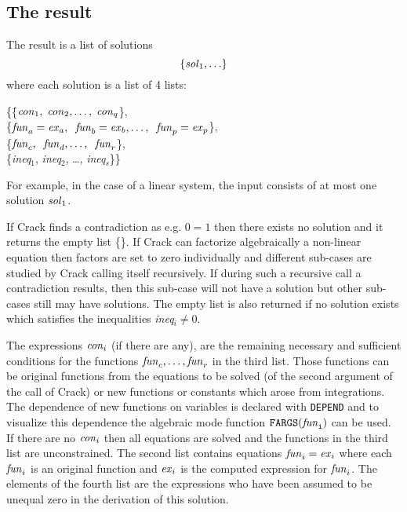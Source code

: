 \documentclass[12pt]{article}
\begin{document}
\subsection{The result}
The result is a list of solutions
\[      \{{\it sol}_1, \ldots \}  \]
where each solution is a list of 4 lists:
\begin{tabbing}
    \{\=\{${\it con}_1, \; {\it con}_2, \ldots , \; {\it con}_q$\}, \\
      \>\{${\it fun}_a={\it ex}_a, \;\;
{\it fun}_b={\it ex}_b, \ldots , \;\; {\it fun}_p={\it ex}_p$\},\=  \\
      \>\{${\it fun}_c, \;\; {\it fun}_d, \ldots , \;\; {\it fun}_r$\}, \> \\
      \>\{{\it ineq}$_1$, {\it ineq}$_2$, \ldots , {\it ineq}$_s$\}\}
\end{tabbing}
For example, in the case of a linear system, the input consists of at
most one solution ${\it sol}_1$.

If {\sc Crack} finds a contradiction as e.g. $0=1$ then there exists no
solution and it returns the empty list \{\}. If {\sc Crack}
can factorize algebraically a non-linear equation then factors are set
to zero individually and different sub-cases are studied by
{\sc Crack} calling itself recursively.
If during such a recursive call a contradiction results,
then this sub-case will not have a solution but other sub-cases still
may have solutions.
The empty list is also returned if no solution exists
which satisfies the inequalities
{\it ineq}$_i \neq 0.$

The expressions ${\it con}_i$ (if there are any), are the
remaining necessary and sufficient conditions for the functions
${\it fun}_c,\ldots,{\it fun}_r$ in the third list. Those
functions can be original functions from the equations to be
solved (of the second argument of the call of {\sc Crack}) or new
functions or constants which arose from integrations.
The dependence of new functions on variables is declared with {\tt DEPEND}
and to visualize this dependence the algebraic mode function
${\tt FARGS({\it fun}_i)}$ can be used.
If there are no ${\it con}_i$ then all equations are solved and the
functions in the third list are unconstrained.
The second list contains
equations ${\it fun}_i={\it ex}_i$ where each ${\it fun}_i$ is an
original function and ${\it ex}_i$ is the computed expression
for ${\it fun}_i$.
The elements of the fourth
list are the expressions who have been assumed to be unequal zero
in the derivation of this solution.
\end{document}
